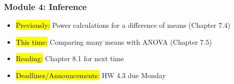 
\begin{frame}
    \frametitle{Module 4: Inference}
    \begin{itemize}
        \item \hl{Previously: }Power calculations for a difference of means (Chapter 7.4)
        \item \hl{This time: }Comparing many means with ANOVA (Chapter 7.5)
        \item \hl{Reading: }Chapter 8.1 for next time
        \item \hl{Deadlines/Announcements: }HW 4.3 due Monday
    \end{itemize}
    
\end{frame}